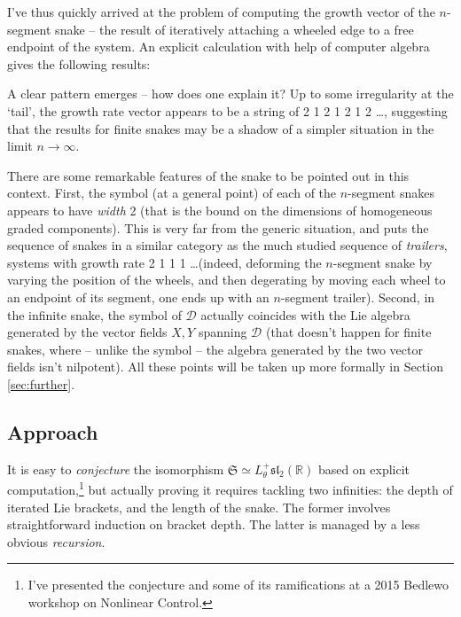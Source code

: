 \documentclass{article}
\def\fsl{\mathfrak{sl}}
\def\fS{\mathfrak{S}}
\def\sD{\mathcal{D}}
\def\RR{\mathbb{R}}
\begin{document}
I've thus quickly arrived at the problem of computing the growth vector of
the $n$-segment snake -- the result of iteratively attaching a wheeled edge  
to a free endpoint of the system. An explicit calculation with help of computer
algebra gives the following results:
\begin{center}\end{center}
A clear pattern emerges -- how does one explain it?
Up to some irregularity at the `tail', the growth rate
vector appears to be a string of 2 1 2 1 2 1 2 \dots,
suggesting that the results for finite snakes may be a shadow
of a simpler situation in the limit $n\to\infty$. 

There are some remarkable features of the snake to be pointed out in this context.
First, the symbol (at a general point) of each of the $n$-segment
snakes appears to have \emph{width} 2 (that is the bound on
the dimensions of homogeneous graded components). This is
very far from the generic situation, and puts the sequence
of snakes in a similar category as the much studied sequence
of \emph{trailers}, systems with growth rate 2 1 1 1 \dots (indeed, deforming the $n$-segment snake
by varying the position of the wheels, and then degerating by moving each wheel to
an endpoint of its segment, one ends up with an $n$-segment trailer). 
Second, in the infinite snake, the symbol of $\sD$ actually coincides with
the Lie algebra generated by the vector fields $X, Y$ spanning $\sD$ (that doesn't
happen for finite snakes, where -- unlike the symbol -- the algebra generated
by the two vector fields isn't nilpotent).
All these points will be taken up more formally in Section \ref{sec:further}.

\subsection{Approach}
It is easy to \emph{conjecture} the isomorphism $\fS \simeq L^+_\theta\fsl_2(\RR)$
based on explicit computation,\footnote{I've presented the conjecture and some of its
ramifications at a 2015 Bedlewo workshop on Nonlinear Control.}
but actually proving it requires tackling two infinities: the depth of iterated Lie brackets,
and the length of the snake.
The former involves straightforward induction on bracket depth.
The latter is managed by a less obvious \emph{recursion}.
\end{document}
